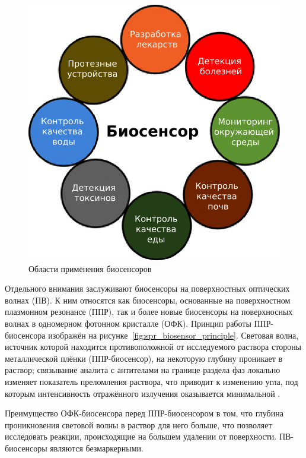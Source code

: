 \documentclass[oneside,final,12pt]{extreport}
\begin{document}
\begin{figure}
  \centering
  \includegraphics[width=.6\textwidth]{pic/areas_of_application_of_biosensors}

  \caption{%
    \label{fig:biosensor_areas_of_application}%
    Области применения биосенсоров%
  }

\end{figure}

Отдельного внимания заслуживают биосенсоры на поверхностных оптических волнах (ПВ).
К ним относятся как биосенсоры, основанные на
поверхностном плазмонном резонансе (ППР)\cite{bib:lrspr_review,bib:spr_simultaneous,bib:spr_biodetection},
так и более новые биосенсоры на поверхносных волнах в
одномерном фотонном кристалле (ОФК)\cite{bib:odpc_visualization}.
Принцип работы ППР-биосенсора изображён на рисунке~\ref{fig:spr_biosensor_principle}.
Световая волна, источник которой находится противоположной от исследуемого раствора
стороны металлической плёнки (ППР-биосенсор), %
на некоторую глубину проникает в раствор;
связывание аналита с антителами на границе раздела фаз
локально изменяет показатель преломления раствора, что приводит к изменению
угла, под которым интенсивность отражённого излучения оказывается минимальной%
\cite{bib:klimov_nanoplasmonics}.

Преимущество ОФК-биосенсора перед ППР-биосенсором в том,
что глубина проникновения световой волны в раствор для него больше,
что позволяет исследовать реакции, происходящие
на большем удалении от поверхности.
ПВ-биосенсоры являются безмаркерными.
\end{document}
